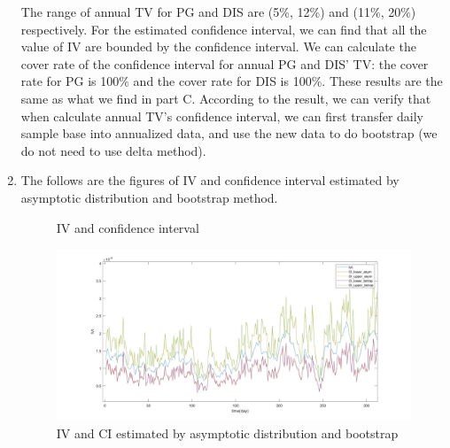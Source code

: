 \documentclass[12pt,letterpaper]{article}
\begin{document}
\begin{enumerate}[label=\textbf{(\Alph*)}]
The range of annual TV for PG and DIS are (5\%, 12\%) and (11\%, 20\%) respectively. For the estimated confidence interval, we can find that all the value of IV are bounded by the confidence interval. We can calculate the cover rate of the confidence interval for annual PG and DIS' TV: the cover rate for PG is 100\% and the cover rate for DIS is 100\%. These results are the same as what we find in part C. According to the result, we can verify that when calculate annual TV's confidence interval, we can first transfer daily sample base into annualized data, and use the new data to do bootstrap (we do not need to use delta method). 


\item The follows are the figures of IV and confidence interval estimated by asymptotic distribution and bootstrap method.
 \begin{figure}[H]
            \centering
            \caption{IV and confidence interval}
\end{figure}

 \begin{figure}[H]
            \centering
            \includegraphics[width=12cm]{figures/p4_ex1_f_3.jpg}
            \caption{IV and CI estimated by asymptotic distribution and bootstrap}
\end{figure}


\end{enumerate}
\end{document}
